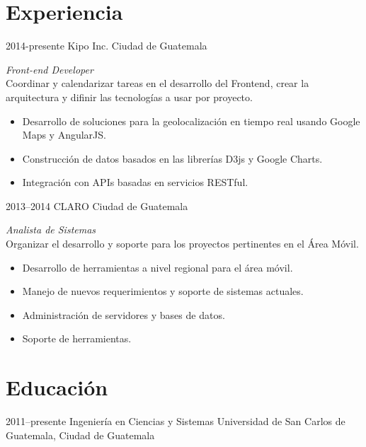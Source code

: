 \documentclass[]{friggeri-cv} %
\begin{document}
\section{Experiencia}
\begin{entrylist}
\entry
	{2014-presente}
	{Kipo Inc.}
	{Ciudad de Guatemala}
	{\emph{Front-end Developer} \\
	Coordinar y calendarizar tareas en el desarrollo del Frontend, crear la arquitectura y difinir las tecnologías a usar por proyecto.
	\begin{itemize}
		\item Desarrollo de soluciones para la geolocalización en tiempo real usando Google Maps y AngularJS.
		\item Construcción de datos basados en las librerías D3js y Google Charts.
		\item Integración con APIs basadas en servicios RESTful.
	\end{itemize}
	
	}
	
\entry
	{2013--2014}
	{CLARO}
	{Ciudad de Guatemala}
	{\emph{Analista de Sistemas} \\
	Organizar el desarrollo y soporte para los proyectos pertinentes en el Área Móvil.
	\begin{itemize}
		\item Desarrollo de herramientas a nivel regional para el área móvil. 
		\item Manejo de nuevos requerimientos y soporte de sistemas actuales.
		\item Administración de servidores y bases de datos.
		\item Soporte de herramientas.
	\end{itemize}
	
	}

\end{entrylist}


\section{Educación}

\begin{entrylist}
\entry
{2011--presente}
{Ingeniería en Ciencias y Sistemas}
{Universidad de San Carlos de Guatemala, Ciudad de Guatemala	}
{}

\end{entrylist}
\end{document}
